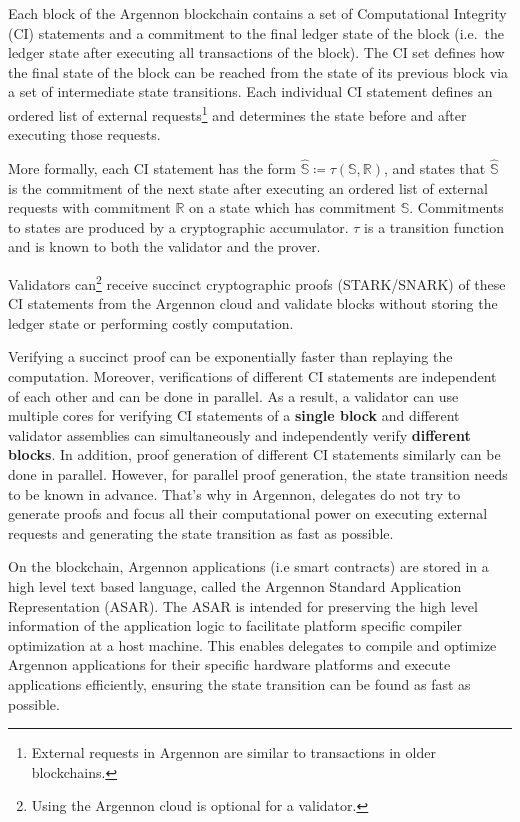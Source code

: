 Each block of the Argennon blockchain contains a set of Computational Integrity (CI) statements and a commitment to
the final ledger state of the block (i.e.\ the ledger state after executing all transactions of the block). The CI
set defines how the final state of the block can be reached from
the state of its previous block via a set of intermediate state transitions. Each individual CI statement defines
an ordered list of external requests\footnote{External requests in Argennon are
similar to transactions in older blockchains.} and determines the state before and after executing those requests.

More formally, each CI statement has the form
$\hat{\mathbb{S}} \coloneqq \tau(\mathbb{S}, \mathbb{R})$, and states that
$\hat{\mathbb{S}}$ is the commitment of the next state after executing an ordered list of external requests with
commitment $\mathbb{R}$ on a state which has commitment $\mathbb{S}$.
Commitments to states are produced by a cryptographic accumulator. $\tau$ is a transition function and is known to
both the validator and the prover.

Validators can\footnote{Using the Argennon cloud is optional for a validator.} receive succinct cryptographic proofs
(STARK/SNARK) of these CI statements from the Argennon cloud and validate blocks without storing the ledger
state or performing costly computation.

Verifying a succinct proof can be exponentially faster than replaying the computation. Moreover, verifications of
different CI statements are independent of each other and can be done in parallel. As a result, a validator can use
multiple cores for verifying CI statements of a \textbf{single block} and different validator assemblies can
simultaneously and
independently verify \textbf{different blocks}.
In addition, proof generation of different CI statements similarly can be done in parallel. However, for parallel
proof generation, the state transition needs to be known in advance. That's why in Argennon, delegates do not try
to generate proofs and focus all their computational power on executing external requests and
generating the state transition as fast as possible.

On the blockchain, Argennon applications (i.e smart contracts) are stored in a high level text based language, called
the Argennon Standard Application Representation (ASAR). The ASAR is intended for preserving the
high level information of the application logic to facilitate platform specific compiler optimization at a host
machine. This enables delegates to compile and optimize Argennon applications for their specific hardware platforms
and execute applications efficiently, ensuring the state transition can be found as fast as possible.

